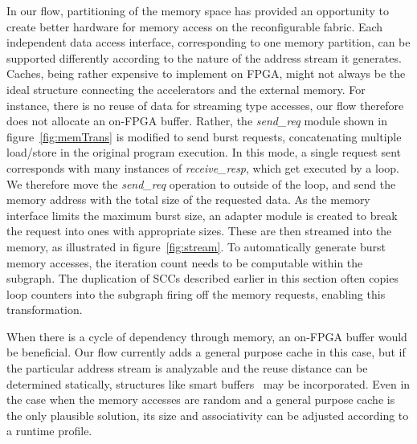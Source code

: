 In our flow, partitioning of the memory space has provided
an opportunity to create better hardware for memory access
on the reconfigurable fabric. Each independent data access
interface, corresponding to one memory partition, can be
supported differently according to the nature of the address
stream it generates. 
Caches, being rather expensive to implement on FPGA, might not always be the
ideal structure connecting the accelerators and the external memory. 
For instance, there is no reuse of data for streaming type accesses, our flow therefore does not allocate
an on-FPGA buffer. Rather, the \textit{send\_req} module shown in
figure~\ref{fig:memTrans} is modified to send burst requests, concatenating
multiple load/store in the original program execution. 
In this mode, a single request sent corresponds with  many instances of \textit{receive\_resp}, which get executed by a loop.  We therefore move the \textit{send\_req} operation to outside of the loop, and send the memory address with the total size of the requested data. As the memory interface limits the maximum
burst size, an adapter module is created to break the request into ones with appropriate sizes. These are then streamed into the memory, as illustrated in
figure~\ref{fig:stream}. To automatically generate burst memory accesses, the iteration count needs to be computable within the subgraph. The duplication
of SCCs described earlier in this section often copies loop counters into
the subgraph firing off the memory requests, enabling this transformation.





When there is a cycle of dependency through memory, 
an on-FPGA buffer would be beneficial. Our flow currently
adds a general purpose cache in this case, but if the particular
address stream is analyzable and the reuse distance can be
determined statically, structures like smart buffers~\cite{Guo:2008} may
be incorporated. Even in the case when the memory accesses
are random and a general purpose cache is the only plausible
solution, its size and associativity can be adjusted according
to a runtime profile.




